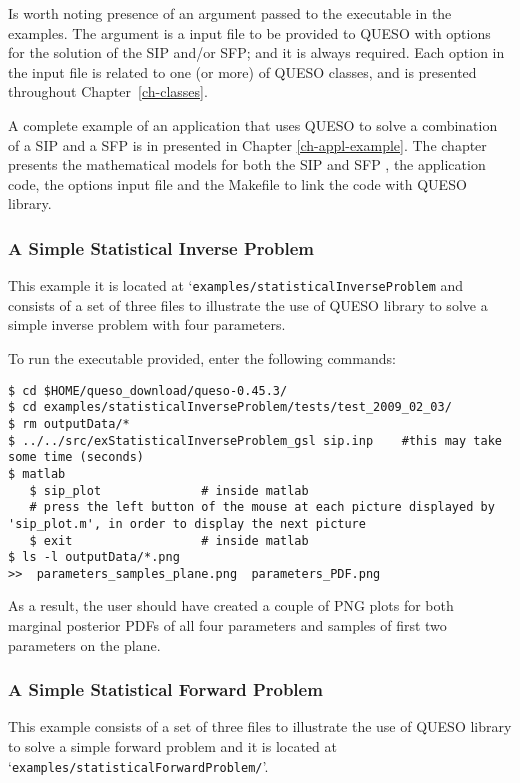 Is worth noting presence of an argument passed to the executable in the examples. The argument is a input file to be provided to QUESO with options for the solution of the SIP and/or SFP; and it is always required. Each option in the input file is related to one (or more) of QUESO classes, and is presented throughout Chapter~\ref{ch-classes}. 

A complete example of an application that uses QUESO to solve a combination of a SIP and a SFP is in presented in Chapter \ref{ch-appl-example}. The chapter presents the mathematical models for both the SIP and SFP , the application code, the options input file and the Makefile to link the code  with QUESO library.


\subsubsection{A Simple Statistical Inverse Problem}\label{sec:executable_sip}

This example it is located at `\verb+examples/statisticalInverseProblem+ and consists of a set  of three files to illustrate the use of QUESO library to solve a simple inverse problem with four parameters.

To run the executable provided, enter the following commands:
\begin{lstlisting}[label={},caption={}]
$ cd $HOME/queso_download/queso-0.45.3/
$ cd examples/statisticalInverseProblem/tests/test_2009_02_03/
$ rm outputData/*
$ ../../src/exStatisticalInverseProblem_gsl sip.inp    #this may take some time (seconds)
$ matlab
   $ sip_plot	           # inside matlab
   # press the left button of the mouse at each picture displayed by 'sip_plot.m', in order to display the next picture
   $ exit	               # inside matlab
$ ls -l outputData/*.png
>>  parameters_samples_plane.png  parameters_PDF.png
\end{lstlisting}

As a result, the user should have created a couple of PNG plots for both marginal posterior PDFs of all four parameters and samples of first two parameters on the plane.

\subsubsection{A Simple Statistical Forward Problem}

This example consists of a set of three files to illustrate the use of QUESO library to solve a simple forward problem and it is located at `\texttt{examples/statisticalForwardProblem/}'. %


